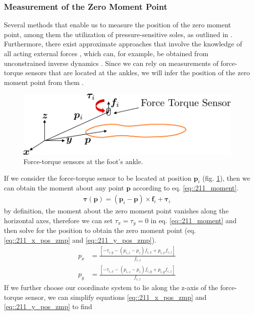 \subsubsection{Measurement of the Zero Moment Point}
Several methods that enable us to measure the position of the zero moment point, among them the utilization of pressure-sensitive soles, as outlined in \cite{kajita2014introduction}. Furthermore, there exist approximate approaches that involve the knowledge of all acting external forces \cite{huang2001planning}, which can, for example, be obtained from unconstrained inverse dynamics \cite{michel2017dynamic}. Since we can rely on measurements of force-torque sensors that are located at the ankles, we will infer the position of the zero moment point from them \cite{kajita2014introduction}. 
\begin{figure}[h!]
	\centering
	\includegraphics[scale=.5]{chapters/02_background/img/ft_sensor.png}
	\caption{Force-torque sensors at the foot's ankle.}
	\label{fig::211_force_torque}
\end{figure}
If we consider the force-torque sensor to be located at position $\bm{p}_i$ (fig. \ref{fig::211_force_torque}), then we can obtain the moment about any point $\bm{p}$ according to eq. \ref{eq::211_moment}.
\begin{align}
	\bm{\tau}(\bm{p}) = (\bm{p}_i-\bm{p})\times \bm{f}_i + \bm{\tau}_i
	\label{eq::211_moment}
\end{align}
by definition, the moment about the zero moment point vanishes along the horizontal axes, therefore we can set $\tau_x = \tau_y = 0$ in eq. \ref{eq::211_moment} and then solve for the position to obtain the zero moment point (eq. \ref{eq::211_x_pos_zmp} and \ref{eq::211_y_pos_zmp}).
\begin{align}
	p_x &= \frac{\left[-\tau_{i,y}-(p_{i,z}-p_z)f_{i,x}+p_{i,x}f_{i,z}\right]}{f_{i,z}}
	\label{eq::211_x_pos_zmp}\\
	p_y &= \frac{\left[-\tau_{i,x}-(p_{i,z}-p_z)f_{i,y}+p_{i,y}f_{i,z}\right]}{f_{i,z}}
	\label{eq::211_y_pos_zmp}
\end{align}
If we further choose our coordinate system to lie along the z-axis of the force-torque sensor, we can simplify equations \ref{eq::211_x_pos_zmp} and \ref{eq::211_y_pos_zmp} to find
